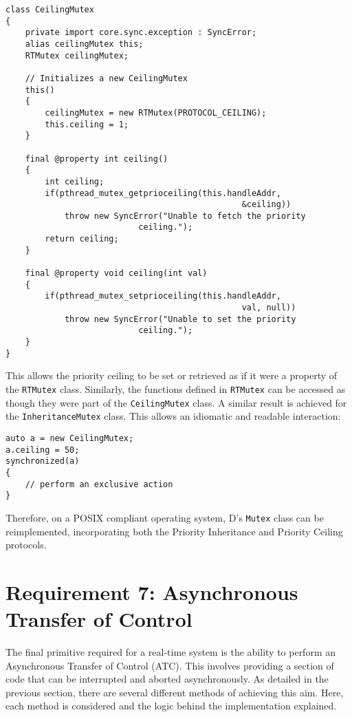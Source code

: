 \begin{lstlisting}[basicstyle=\small]
class CeilingMutex 
{
    private import core.sync.exception : SyncError;
    alias ceilingMutex this;
    RTMutex ceilingMutex;

    // Initializes a new CeilingMutex
    this()
    {
        ceilingMutex = new RTMutex(PROTOCOL_CEILING);
        this.ceiling = 1;
    }

    final @property int ceiling()
    {
        int ceiling; 
        if(pthread_mutex_getprioceiling(this.handleAddr, 
                                                &ceiling))
            throw new SyncError("Unable to fetch the priority 
                           ceiling."); 
        return ceiling; 
    }

    final @property void ceiling(int val)
    {
        if(pthread_mutex_setprioceiling(this.handleAddr, 
                                                val, null))
            throw new SyncError("Unable to set the priority 
                           ceiling."); 
    }
}
\end{lstlisting}
This allows the priority ceiling to be set or retrieved as if it were a property of 
the \texttt{RTMutex} class. Similarly, the functions defined in \texttt{RTMutex} 
can be accessed as though they were part of the \texttt{CeilingMutex} class. 
A similar result is achieved for the \texttt{InheritanceMutex} class.
This allows an idiomatic and readable interaction: 
\begin{lstlisting}[basicstyle=\small]
auto a = new CeilingMutex;
a.ceiling = 50; 
synchronized(a) 
{
    // perform an exclusive action
}
\end{lstlisting}
Therefore, on a POSIX compliant operating system, D's \texttt{Mutex} class can 
be reimplemented, incorporating both the Priority Inheritance and 
Priority Ceiling protocols. 

\section{Requirement 7: Asynchronous Transfer of Control} %
The final primitive required for a real-time system is the ability to perform an Asynchronous Transfer of 
Control (ATC). This involves providing a section of code that can be interrupted 
and aborted asynchronously.
As detailed in the previous section, there are several different methods of 
achieving this aim. Here, each method is considered and the logic behind the 
implementation explained. 

